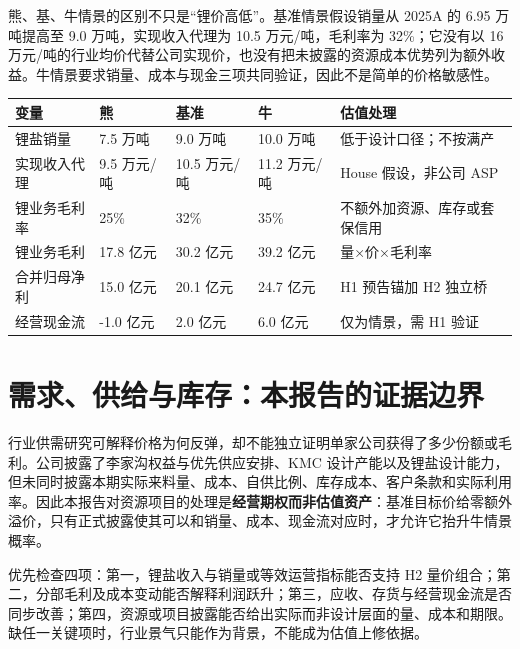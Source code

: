 熊、基、牛情景的区别不只是“锂价高低”。基准情景假设销量从 2025A 的 6.95 万吨提高至 9.0 万吨，实现收入代理为 10.5 万元/吨，毛利率为 32\%；它没有以 16 万元/吨的行业均价代替公司实现价，也没有把未披露的资源成本优势列为额外收益。牛情景要求销量、成本与现金三项共同验证，因此不是简单的价格敏感性。

\begin{exhibitbox}[表 10-2：2026E 周期变量与合并利润的映射]
\begin{tabularx}{\exhibitboxwidth}{L{3.0cm}R{2.0cm}R{2.0cm}R{2.0cm}X}
\toprule
变量 & 熊 & 基准 & 牛 & 估值处理 \\
\midrule
锂盐销量 & 7.5 万吨 & 9.0 万吨 & 10.0 万吨 & 低于设计口径；不按满产 \\
实现收入代理 & 9.5 万元/吨 & 10.5 万元/吨 & 11.2 万元/吨 & House 假设，非公司 ASP \\
锂业务毛利率 & 25\% & 32\% & 35\% & 不额外加资源、库存或套保信用 \\
锂业务毛利 & 17.8 亿元 & 30.2 亿元 & 39.2 亿元 & 量×价×毛利率 \\
合并归母净利 & 15.0 亿元 & 20.1 亿元 & 24.7 亿元 & H1 预告锚加 H2 独立桥 \\
经营现金流 & -1.0 亿元 & 2.0 亿元 & 6.0 亿元 & 仅为情景，需 H1 验证 \\
\bottomrule
\end{tabularx}
\end{exhibitbox}

\section{需求、供给与库存：本报告的证据边界}

行业供需研究可解释价格为何反弹，却不能独立证明单家公司获得了多少份额或毛利。公司披露了李家沟权益与优先供应安排、KMC 设计产能以及锂盐设计能力，但未同时披露本期实际来料量、成本、自供比例、库存成本、客户条款和实际利用率。因此本报告对资源项目的处理是\textbf{经营期权而非估值资产}：基准目标价给零额外溢价，只有正式披露使其可以和销量、成本、现金流对应时，才允许它抬升牛情景概率。

\begin{sourcequalitybox}[正式 H1 对周期判断的最小验证包]
优先检查四项：第一，锂盐收入与销量或等效运营指标能否支持 H2 量价组合；第二，分部毛利及成本变动能否解释利润跃升；第三，应收、存货与经营现金流是否同步改善；第四，资源或项目披露能否给出实际而非设计层面的量、成本和期限。缺任一关键项时，行业景气只能作为背景，不能成为估值上修依据。
\end{sourcequalitybox}

